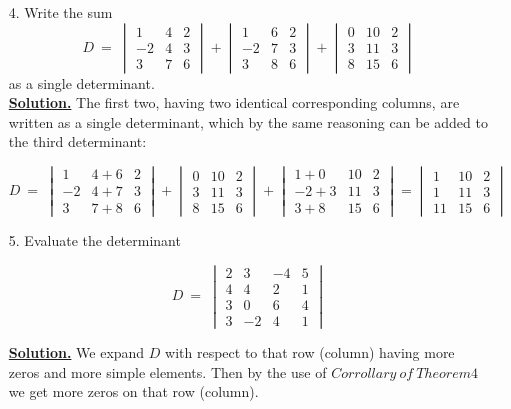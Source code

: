 \documentclass{article}
\begin{document}
\begin{enumerate}
    \item[4.] Write the sum
    $$D\ =\ 
    \begin{vmatrix}
    1 & 4 & 2\\
    -2 & 4 & 3\\
    3 & 7 & 6
    \end{vmatrix}+
    \begin{vmatrix}
    1 & 6 & 2\\
    -2 & 7 & 3\\
    3 & 8 & 6
    \end{vmatrix}+
    \begin{vmatrix}
    0 & 10 & 2\\
    3 & 11 & 3\\
    8 & 15 & 6
    \end{vmatrix}
    $$as a single determinant.\\
    \underline{\textbf{Solution.}} The first two, having two identical corresponding columns, are written as a single determinant, which by the same reasoning can be added to the third determinant:
    \begin{center}
    $$D\ =\ 
    \begin{vmatrix}
    1 & 4+6 & 2\\
    -2 & 4+7 & 3\\
    3 & 7+8 & 6
    \end{vmatrix}+
    \begin{vmatrix}
    0 & 10 & 2\\
    3 & 11 & 3\\
    8 & 15 & 6
    \end{vmatrix}+
    \begin{vmatrix}
    1+0 & 10 & 2\\
    -2+3 & 11 & 3\\
    3+8 & 15 & 6
    \end{vmatrix}=
    \begin{vmatrix}
    1 & 10 & 2\\
    1 & 11 & 3\\
    11 & 15 & 6
    \end{vmatrix}
    $$
    \end{center}
    \item[5.] Evaluate the determinant
    \begin{center}
    $$D\ =\ 
    \begin{vmatrix}
    2 & 3 & -4 & 5\\
    4 & 4 & 2 & 1\\
    3 & 0 & 6 & 4\\
    3 & -2 & 4 & 1
    \end{vmatrix}
    $$
    \end{center}
    \underline{\textbf{Solution.}} We expand $D$ with respect to that row (column) having more zeros and more simple elements. Then by the use of $Corrollary\ of\ Theorem 4$ we get more zeros on that row (column).
\end{enumerate}
\end{document}
